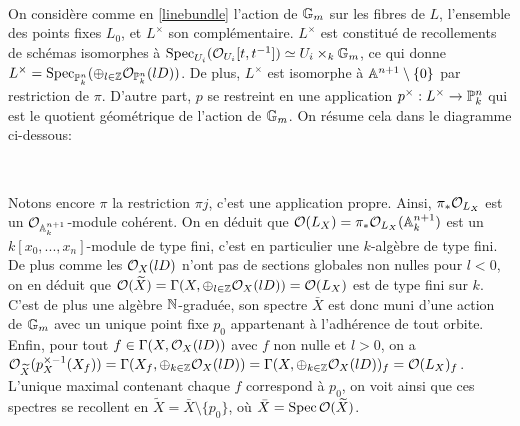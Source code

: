	\begin{center}
	\\
	\end{center}


On considère comme en \ref{linebundle} l'action de $\mathbb{G}_m$ sur les fibres de $L$, l'ensemble des points fixes $L_0$, et $L^\times$ son complémentaire. $L^\times$ est constitué de recollements de schémas isomorphes à $\operatorname{Spec}_{U_i}( \mathcal{O}_{U_i}[t,t^{-1}])\simeq U_i \times_k \mathbb{G}_m$, ce qui donne $L^\times=\operatorname{Spec}_{\mathbb{P}^n_k}(\oplus_{l\in \mathbb{Z}}\mathcal{O}_{\mathbb{P}^n_k}(lD))$. De plus, $L^\times$ est isomorphe à $\mathbb{A}^{n+1}\setminus\lbrace 0 \rbrace$ par restriction de $\pi$. D'autre part, $p$ se restreint en une application $p^\times:L^\times \rightarrow \mathbb{P}^n_k$ qui est le quotient géométrique de l'action de $\mathbb{G}_m$. On résume cela dans le diagramme ci-dessous:

	\begin{center}
	\\
	\end{center}

Notons encore $\pi$ la restriction $\pi j$, c'est une application propre. Ainsi, $\pi_*\mathcal{O}_{L_X}$ est un $\mathcal{O}_{\mathbb{A}_k^{n+1}}$-module cohérent. On en déduit que $\mathcal{O}(L_X)=\pi_*\mathcal{O}_{L_X}(\mathbb{A}_k^{n+1})$ est un $k[x_0,...,x_n]$-module de type fini, c'est en particulier une $k$-algèbre de type fini. De plus comme les $\mathcal{O}_X(lD)$ n'ont pas de sections globales non nulles pour $l<0$, on en déduit que $\mathcal{O}(\widetilde{X})=\Gamma(X,\oplus_{l\in \mathbb{Z}}\mathcal{O}_X(lD))=\mathcal{O}(L_X)$ est de type fini sur $k$. C'est de plus une algèbre $\mathbb{N}$-graduée, son spectre $\bar{X}$ est donc muni d'une action de $\mathbb{G}_m$ avec un unique point fixe $p_0$ appartenant à l'adhérence de tout orbite. Enfin, pour tout $f\in \Gamma(X,\mathcal{O}_X(lD))$ avec $f$ non nulle et $l>0$, on a  $\mathcal{O}_{\widetilde{X}}(p_X^{\times-1}(X_f))=\Gamma(X_f,\oplus_{k\in \mathbb{Z}}\mathcal{O}_X(lD))=\Gamma(X,\oplus_{k\in \mathbb{Z}}\mathcal{O}_X(lD))_f=\mathcal{O}(L_X)_f$. L'unique maximal contenant chaque $f$ correspond à $p_0$, on voit ainsi que ces spectres se recollent en $\widetilde{X}=\bar{X}\setminus \lbrace p_0 \rbrace$, où $\bar{X}=\operatorname{Spec}\mathcal{O}(\widetilde{X})$.\\

